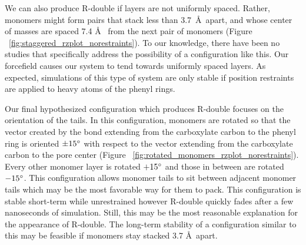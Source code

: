 \documentclass[journal=jpcbfk,manusciprt=article]{achemso}
\begin{document}
  We can also produce R-double if layers are not uniformly spaced. Rather, monomers might form 
  pairs that stack less than 3.7~\AA~apart, and whose center of masses are spaced 7.4 \AA~ 
  from the next pair of monomers (Figure ~\ref{fig:staggered_rzplot_norestraints}). To our 
  knowledge, there have been no studies that specifically address the possibility of a
  configuration like this. Our forcefield causes our system to tend towards uniformly spaced
  layers. As expected, simulations of this type of system are only stable if position restraints
  are applied to heavy atoms of the phenyl rings.
  
  Our final hypothesized configuration which produces R-double focuses on the orientation of the
  tails. In this configuration, monomers are rotated so that the vector created by the  
  bond extending from the carboxylate carbon to the phenyl ring is oriented $\pm 15 \degree$
  with respect to the vector extending from the carboxylate carbon to the pore	center (Figure
  ~\ref{fig:rotated_monomers_rzplot_norestraints}). Every other monomer layer is rotated $+15
  \degree$ and those in between are rotated $-15 \degree$. This configuration allows monomer
  tails to sit between adjacent monomer tails which may be the most favorable way for them to
  pack. This configuration is stable short-term while unrestrained however R-double quickly 
  fades after a few nanoseconds of simulation. Still, this may be the most reasonable
  explanation for the appearance of R-double. The long-term stability of a configuration
  similar to this may be feasible if monomers stay stacked 3.7 \AA~apart. 
  
\end{document}
